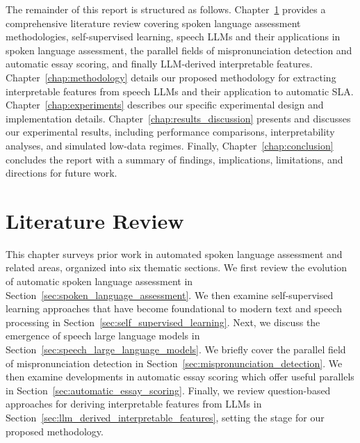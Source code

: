 \documentclass{report}
\begin{document}
The remainder of this report is structured as follows. Chapter~\ref{chap:lit_review} provides a comprehensive literature review covering spoken language assessment methodologies, self-supervised learning, speech LLMs and their applications in spoken language assessment, the parallel fields of mispronunciation detection and automatic essay scoring, and finally LLM-derived interpretable features. Chapter~\ref{chap:methodology} details our proposed methodology for extracting interpretable features from speech LLMs and their application to automatic SLA. Chapter~\ref{chap:experiments} describes our specific experimental design and implementation details. Chapter~\ref{chap:results_discussion} presents and discusses our experimental results, including performance comparisons, interpretability analyses, and simulated low-data regimes. Finally, Chapter~\ref{chap:conclusion} concludes the report with a summary of findings, implications, limitations, and directions for future work.

\chapter{Literature Review}
\label{chap:lit_review}
This chapter surveys prior work in automated spoken language assessment and related areas, organized into six thematic sections. We first review the evolution of automatic spoken language assessment in Section~\ref{sec:spoken_language_assessment}. We then examine self-supervised learning approaches that have become foundational to modern text and speech processing in Section~\ref{sec:self_supervised_learning}. Next, we discuss the emergence of speech large language models in Section~\ref{sec:speech_large_language_models}. We briefly cover the parallel field of mispronunciation detection in Section~\ref{sec:mispronunciation_detection}. We then examine developments in automatic essay scoring which offer useful parallels in Section~\ref{sec:automatic_essay_scoring}. Finally, we review question-based approaches for deriving interpretable features from LLMs in Section~\ref{sec:llm_derived_interpretable_features}, setting the stage for our proposed methodology.
\end{document}
